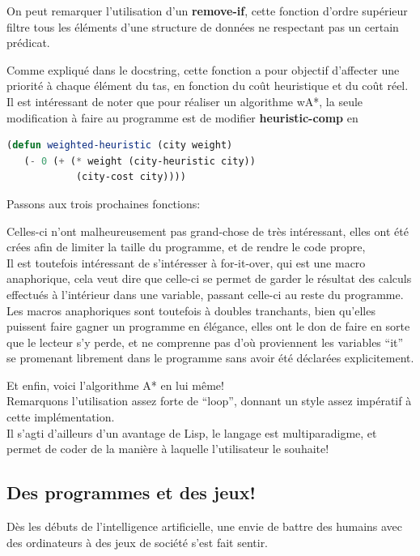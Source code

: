 \documentclass[a4paper, 12pt]{article}
\newcommand{\pather}[1]{
  
}
\numberwithin{equation}{subsection}
\begin{document}
On peut remarquer l'utilisation d'un {\bf remove-if}, cette fonction d'ordre supérieur filtre tous les éléments d'une structure de données ne respectant pas un certain prédicat.
\pather{64-69}
Comme expliqué dans le docstring, cette fonction a pour objectif d'affecter une priorité à chaque élément du tas, en fonction du coût heuristique et du coût réel. \\

Il est intéressant de noter que pour réaliser un algorithme wA*, la seule modification à faire au programme est de modifier {\bf heuristic-comp} en
\begin{lstlisting}[language=Lisp]
(defun weighted-heuristic (city weight)
   (- 0 (+ (* weight (city-heuristic city))
            (city-cost city))))
\end{lstlisting}
Passons aux trois prochaines fonctions:
\pather{71-85}
Celles-ci n'ont malheureusement pas grand-chose de très intéressant,
elles ont été crées afin de limiter la taille du programme, et de rendre le code propre, \\

Il est toutefois intéressant de s'intéresser à for-it-over, qui est une macro anaphorique, cela veut dire que celle-ci se permet de garder le résultat des calculs effectués à l'intérieur dans une variable, passant celle-ci au reste du programme. \\

Les macros anaphoriques sont toutefois à doubles tranchants, bien qu'elles puissent faire gagner un programme en élégance, elles ont le don de faire en sorte que le lecteur s'y perde, et ne comprenne pas d'où proviennent les variables ``it'' se promenant librement dans le programme sans avoir été déclarées explicitement.
\pather{89-130}
Et enfin, voici l'algorithme A* en lui même! \\

Remarquons l'utilisation assez forte de ``loop'', donnant un style assez impératif à cette implémentation. \\

Il s'agti d'ailleurs d'un avantage de Lisp, le langage est multiparadigme, et permet de coder de la manière à laquelle l'utilisateur le souhaite! \\
\subsection{Des programmes et des jeux!}
Dès les débuts de l'intelligence artificielle, une envie de battre des humains avec des ordinateurs à des jeux de société s'est fait sentir. \\
\end{document}
